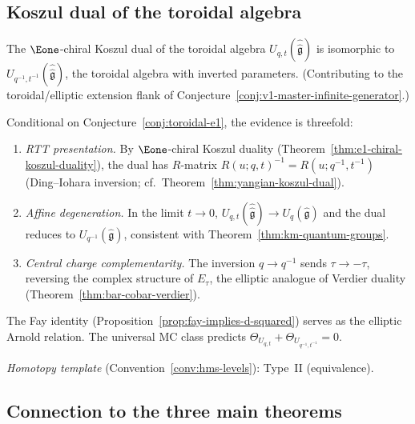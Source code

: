 \subsection{Koszul dual of the toroidal algebra}

\begin{conjecture}
\label{conj:toroidal-koszul-dual}
The $\Eone$-chiral Koszul dual of the toroidal algebra
$U_{q,t}(\hat{\hat{\mathfrak{g}}})$ is isomorphic to
$U_{q^{-1},t^{-1}}(\hat{\hat{\mathfrak{g}}})$,
the toroidal algebra with inverted parameters.
(Contributing to the toroidal/elliptic extension flank of
Conjecture~\ref{conj:v1-master-infinite-generator}.)
\end{conjecture}

\begin{remark}[Evidence]\label{rem:toroidal-koszul-evidence}
Conditional on Conjecture~\ref{conj:toroidal-e1}, the evidence is threefold:
\begin{enumerate}[label=\textup{(\roman*)}]
\item \emph{RTT presentation.} By $\Eone$-chiral Koszul duality (Theorem~\ref{thm:e1-chiral-koszul-duality}), the dual has $R$-matrix $R(u;q,t)^{-1} = R(u;q^{-1},t^{-1})$ (Ding--Iohara inversion; cf.\ Theorem~\ref{thm:yangian-koszul-dual}).
\item \emph{Affine degeneration.} In the limit $t \to 0$, $U_{q,t}(\hat{\hat{\mathfrak{g}}}) \to U_q(\hat{\mathfrak{g}})$ and the dual reduces to $U_{q^{-1}}(\hat{\mathfrak{g}})$, consistent with Theorem~\ref{thm:km-quantum-groups}.
\item \emph{Central charge complementarity.} The inversion $q \to q^{-1}$ sends $\tau \to -\tau$, reversing the complex structure of $E_\tau$, the elliptic analogue of Verdier duality (Theorem~\ref{thm:bar-cobar-verdier}).
\end{enumerate}
The Fay identity (Proposition~\ref{prop:fay-implies-d-squared}) serves as the elliptic Arnold relation. The universal MC class predicts $\Theta_{U_{q,t}} + \Theta_{U_{q^{-1},t^{-1}}} = 0$.

\emph{Homotopy template} (Convention~\ref{conv:hms-levels}): Type~II (equivalence).
\end{remark}

\subsection{Connection to the three main theorems}

